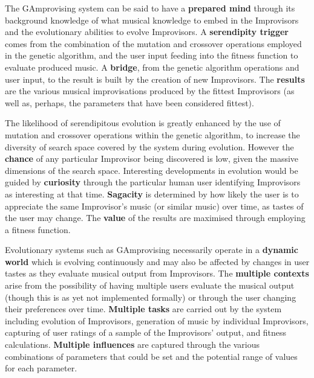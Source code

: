 The GAmprovising system can be said to have a \textbf{prepared mind} through its background knowledge of what musical knowledge to embed in the Improvisors and the evolutionary abilities to evolve Improvisors. A \textbf{serendipity trigger} comes from the combination of the mutation and crossover operations employed in the genetic algorithm, and the user input feeding into the fitness function to evaluate produced music. A \textbf{bridge}, from the genetic algorithm operations and user input, to the result is built by the creation of new Improvisors. The \textbf{results} are the various musical improvisations produced by the fittest Improvisors (as well as, perhaps, the parameters that have been considered fittest).

The likelihood of serendipitous evolution is greatly enhanced by the use of mutation and crossover operations within the genetic algorithm, to increase the diversity of search space covered by the system during evolution. However the \textbf{chance} of any particular Improvisor being discovered is low, given the massive dimensions of the search space.  Interesting developments in evolution would be guided by \textbf{curiosity} through the particular human user identifying Improvisors as interesting at that time. \textbf{Sagacity} is determined by how likely the user is to appreciate the same Improvisor's music (or similar music) over time, as tastes of the user may change. The \textbf{value} of the results are maximised through employing a fitness function.

Evolutionary systems such as GAmprovising necessarily operate in a \textbf{dynamic world} which is evolving continuously and may also be affected by changes in user tastes as they evaluate musical output from Improvisors. The \textbf{multiple contexts} arise from the possibility of having multiple users evaluate the musical output (though this is as yet not implemented formally) or through the user changing their preferences over time. \textbf{Multiple tasks} are carried out by the system including evolution of Improvisors, generation of music by individual Improvisors, capturing of user ratings of a sample of the Improvisors' output, and fitness calculations. \textbf{Multiple influences} are captured through the various combinations of parameters that could be set and the potential range of values for each parameter.


